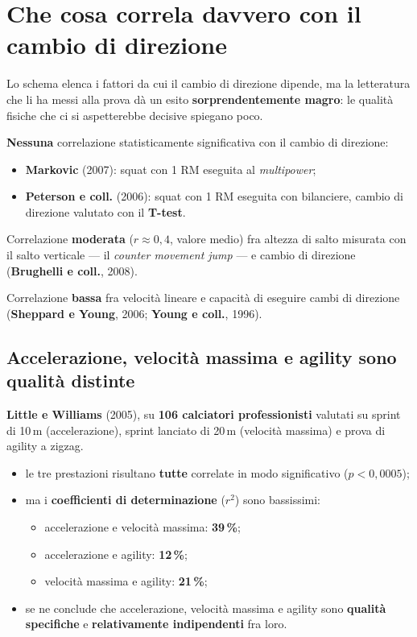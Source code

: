 \section{Che cosa correla davvero con il cambio di direzione}

Lo schema elenca i fattori da cui il cambio di direzione dipende, ma la letteratura che li ha messi
alla prova dà un esito \textbf{sorprendentemente magro}: le qualità fisiche che ci si aspetterebbe
decisive spiegano poco.

\textbf{Nessuna} correlazione statisticamente significativa con il cambio di direzione:
\begin{itemize}
  \item \textbf{Markovic} (2007): squat con 1 RM eseguita al \textit{multipower};
  \item \textbf{Peterson e coll.} (2006): squat con 1 RM eseguita con bilanciere, cambio di
    direzione valutato con il \textbf{T-test}.
\end{itemize}

Correlazione \textbf{moderata} ($r \approx 0,4$, valore medio) fra altezza di salto misurata con il
salto verticale --- il \textit{counter movement jump} --- e cambio di direzione
(\textbf{Brughelli e coll.}, 2008).

Correlazione \textbf{bassa} fra velocità lineare e capacità di eseguire cambi di direzione
(\textbf{Sheppard e Young}, 2006; \textbf{Young e coll.}, 1996).

\subsection{Accelerazione, velocità massima e agility sono qualità distinte}

\textbf{Little e Williams} (2005), su \textbf{106 calciatori professionisti} valutati su sprint di
10\,m (accelerazione), sprint lanciato di 20\,m (velocità massima) e prova di agility a zigzag.

\begin{itemize}
  \item le tre prestazioni risultano \textbf{tutte} correlate in modo significativo
    ($p < 0,0005$);
  \item ma i \textbf{coefficienti di determinazione} ($r^2$) sono bassissimi:
    \begin{itemize}
      \item accelerazione e velocità massima: \textbf{39\,\%};
      \item accelerazione e agility: \textbf{12\,\%};
      \item velocità massima e agility: \textbf{21\,\%};
    \end{itemize}
  \item se ne conclude che accelerazione, velocità massima e agility sono \textbf{qualità
    specifiche} e \textbf{relativamente indipendenti} fra loro.
\end{itemize}

